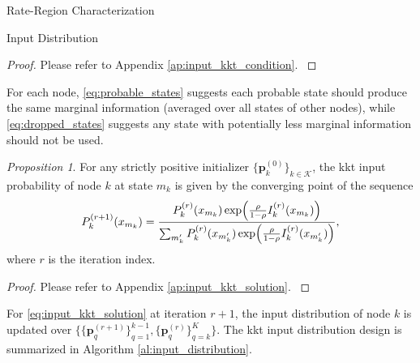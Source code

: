 \documentclass[journal,12pt,onecolumn,draftclsnofoot]{IEEEtran}
\theoremstyle{remark}
\newtheorem{proposition}{Proposition}
\begin{document}
\begin{section}{Rate-Region Characterization}
\begin{subsection}{Input Distribution}
		\begin{proof}
			Please refer to Appendix \ref{ap:input_kkt_condition}.
			\label{pf:input_kkt_condition}
		\end{proof}

		For each node, \eqref{eq:probable_states} suggests each probable state should produce the same marginal information (averaged over all states of other nodes), while \eqref{eq:dropped_states} suggests any state with potentially less marginal information should not be used.
		\begin{proposition}
			For any strictly positive initializer $\{\boldsymbol{p}_k^{(0)}\}_{k \in \mathcal{K}}$, the \gls{kkt} input probability of node $k$ at state $m_k$ is given by the converging point of the sequence
			\begin{equation}
				P_k^{(r+1)}(x_{m_k}) = \frac{P_k^{(r)}(x_{m_k}) \exp \Bigl( \frac{\rho}{1 - \rho} I_k^{(r)}(x_{m_k}) \Bigr)}{\sum_{m_k'} P_k^{(r)}(x_{m_k'}) \exp \Bigl( \frac{\rho}{1 - \rho} I_k^{(r)}(x_{m_k'}) \Bigr)},
				\label{eq:input_kkt_solution}
			\end{equation}
			where $r$ is the iteration index.
			\label{pr:input_kkt_solution}
		\end{proposition}
		\begin{proof}
			Please refer to Appendix \ref{ap:input_kkt_solution}.
			\label{pf:input_kkt_solution}
		\end{proof}

		For \eqref{eq:input_kkt_solution} at iteration $r+1$, the input distribution of node $k$ is updated over $\bigl\{\{\boldsymbol{p}_q^{(r+1)}\}_{q=1}^{k-1},\{\boldsymbol{p}_q^{(r)}\}_{q=k}^{K}\bigr\}$.
		The \gls{kkt} input distribution design is summarized in Algorithm \ref{al:input_distribution}.


\end{subsection}
\end{section}
\end{document}
